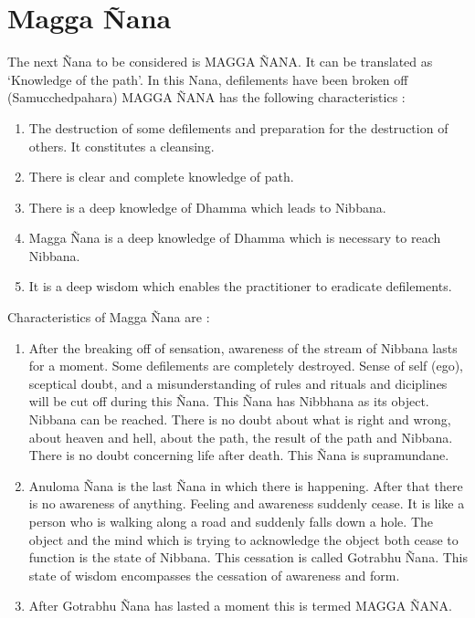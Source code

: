 \documentclass[a5paper,10pt,english]{book}
\begin{document}
\section{Magga Ñana}
\label{\detokenize{progress:magga-nana}}
\sphinxAtStartPar
The next Ñana to be considered is MAGGA ÑANA. It can be translated as ‘Knowledge of the path’. In this Nana, defilements have been broken off (Samucchedpahara) MAGGA ÑANA has the following characteristics :\sphinxhyphen{}
\begin{enumerate}
%
\item {} 
\sphinxAtStartPar
The destruction of some defilements and preparation for the destruction of others. It constitutes a cleansing.

\item {} 
\sphinxAtStartPar
There is clear and complete knowledge of path.

\item {} 
\sphinxAtStartPar
There is a deep knowledge of Dhamma which leads to Nibbana.

\item {} 
\sphinxAtStartPar
Magga Ñana is a deep knowledge of Dhamma which is necessary to reach Nibbana.

\item {} 
\sphinxAtStartPar
It is a deep wisdom which enables the practitioner to eradicate defilements.

\end{enumerate}

\sphinxAtStartPar
Characteristics of Magga Ñana are :\sphinxhyphen{}
\begin{enumerate}
%
\item {} 
\sphinxAtStartPar
After the breaking off of sensation, awareness of the stream of Nibbana lasts for a moment. Some defilements are completely destroyed. Sense of self (ego), sceptical doubt, and a misunderstanding of rules and rituals and diciplines will be cut off during this Ñana. This Ñana has Nibbhana as its object. Nibbana can be reached. There is no doubt about what is right and wrong, about heaven and hell, about the path, the result of the path and Nibbana. There is no doubt concerning life after death. This Ñana is supramundane.

\item {} 
\sphinxAtStartPar
Anuloma Ñana is the last Ñana in which there is happening. After that there is no awareness of anything. Feeling and awareness suddenly cease. It is like a person who is walking along a road and suddenly falls down a hole. The object and the mind which is trying to acknowledge the object both cease to function is the state of Nibbana. This cessation is called Gotrabhu Ñana. This state of wisdom encompasses the cessation of awareness and form.

\item {} 
\sphinxAtStartPar
After Gotrabhu Ñana has lasted a moment this is termed MAGGA ÑANA.

\end{enumerate}
\end{document}
